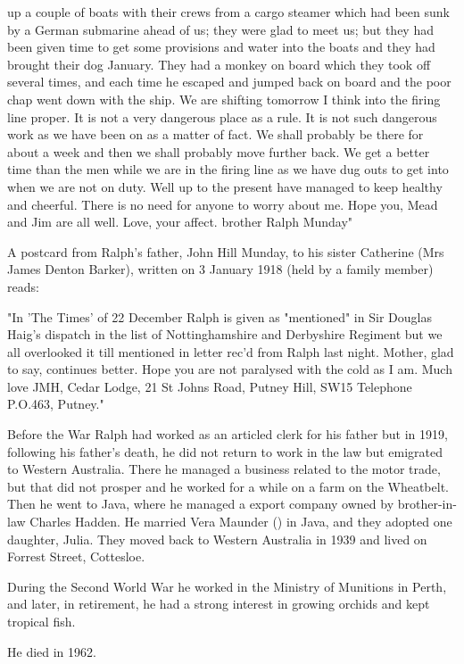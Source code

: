 up a couple of boats with their crews from a cargo steamer which had been sunk by a German submarine ahead of us; they were glad to meet us; but they had been given time to get some provisions and water into the boats and they had brought their dog January. They had a monkey on board which they took off several times, and each time he escaped and jumped back on board and the poor chap went down with the ship.
    We are shifting tomorrow I think into the firing line proper. It is not a very dangerous place as a rule. It is not such dangerous work as we have been on as a matter of fact. We shall probably be there for about a week and then we shall probably move further back. We get a better time than the men while we are in the firing line as we have dug outs to get into when we are not on duty.
    Well up to the present have managed to keep healthy and cheerful. There is no need for anyone to worry about me.
    Hope you, Mead and Jim are all well.
    Love, your affect. brother
    Ralph Munday" 

 A postcard from Ralph's father, John Hill Munday, to his sister Catherine (Mrs James Denton Barker), written on 3 January 1918 (held by a family member) reads:

    "In 'The Times' of 22 December Ralph is given as "mentioned" in Sir Douglas Haig's dispatch in the list of Nottinghamshire and Derbyshire Regiment but we all overlooked it till mentioned in letter rec'd from Ralph last night.
    Mother, glad to say, continues better.
    Hope you are not paralysed with the cold as I am.
    Much love JMH, Cedar Lodge, 21 St Johns Road, Putney Hill, SW15
    Telephone P.O.463, Putney."

Before the War Ralph had worked as an articled clerk for his father but in 1919, following his father's death, he did not return to work in the law but emigrated to Western Australia.  There he managed a business related to the motor trade, but that did not prosper and he worked for a while on a farm on the Wheatbelt. Then he went to Java,  where he managed a export company owned by brother-in-law Charles Hadden.  He married Vera Maunder () in Java,\cite{LadiesSection} and they adopted one daughter, Julia.
They  moved back to Western Australia in 1939 and lived on Forrest Street, Cottesloe. 

During the Second World War he worked in the Ministry of Munitions in Perth, and later, in retirement, he had a strong interest in growing orchids and kept tropical fish. 

He died in 1962.\cite{RalphMundayBMD}




  
